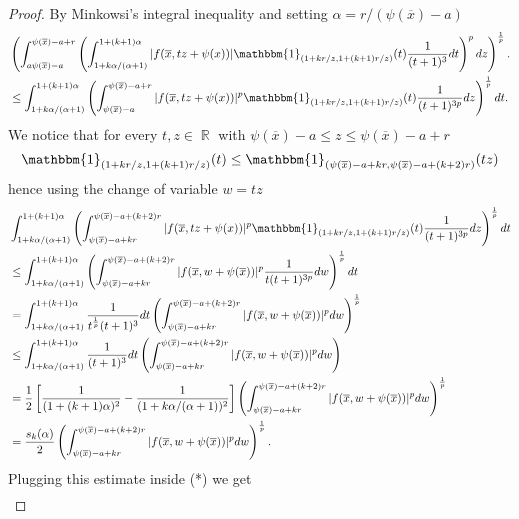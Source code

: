 \documentclass[12pt]{article}
\theoremstyle{definition}
\DeclareMathOperator\rr{\mathbb{R}}
\begin{document}
\begin{proof}
 By Minkowsi's integral inequality and setting $\alpha=r/(\psi(\overline x)-a)$
 \begin{align*}
  & \left( \int_{a\psi(\overline x) -a}^{\psi(\overline x) -a+r}\left (\int_{1+k\alpha/(\alpha+1)}^{1+(k+1)\alpha} |f(\overline x, tz+\psi(x))|\mathbbm{1}_{(1+kr/z,  1+(k+1)r/z ) }(t)\frac{1}{(t+1)^3}dt\right)^pdz \right)^{\frac{1}{p}}. \\
  &\le \int_{1+k\alpha/(\alpha+1)}^{1+(k+1)\alpha} \left ( \int_{\psi(\overline x) -a}^{\psi(\overline x) -a+r}|f(\overline x, tz+\psi(x))|^p\mathbbm{1}_{(1+kr/z,  1+(k+1)r/z ) }(t)\frac{1}{(t+1)^{3p}} dz \right) ^{\frac{1}{p}}dt.  
 \end{align*}
 We notice that for every $t,z \in \rr$ with $\psi(\overline x) -a \le z \le \psi(\overline x)-a+r$
 \[ \mathbbm{1}_{(1+kr/z,  1+(k+1)r/z ) }(t) \le \mathbbm{1}_{(\psi(\overline x)-a+kr, \psi(\overline x) - a+(k+2)r)}(tz)   \]
 hence using the change of variable $w=tz$
 \begin{align*}
 &\int_{1+k\alpha/(\alpha+1)}^{1+(k+1)\alpha} \left ( \int_{\psi(\overline x)-a+kr}^{\psi(\overline x)-a+(k+2)r}|f(\overline x, tz+\psi(x))|^p\mathbbm{1}_{(1+kr/z,  1+(k+1)r/z ) }(t)\frac{1}{(t+1)^{3p}} dz \right) ^{\frac{1}{p}}dt \\
&\le \int_{1+k\alpha/(\alpha+1)}^{1+(k+1)\alpha} \left ( \int_{\psi(\overline x)-a+kr}^{\psi(\overline x)-a+(k+2)r}|f(\overline x, w+\psi(\overline x))|^p \frac{1}{t(t+1)^{3p}} dw \right) ^{\frac{1}{p}}dt\\
&=\int_{1+k\alpha/(\alpha+1)}^{1+(k+1)\alpha}\frac{1}{t^{\frac{1}{p}}(t+1)^{3}}dt \left ( \int_{\psi(\overline x)-a+kr}^{\psi(\overline x)-a+(k+2)r}|f(\overline x, w+\psi(\overline x))|^p  dw \right) ^{\frac{1}{p}}\\
&\le \int_{1+k\alpha/(\alpha+1)}^{1+(k+1)\alpha}\frac{1}{(t+1)^{3}}dt \left ( \int_{\psi(\overline x)-a+kr}^{\psi(\overline x)-a+(k+2)r}|f(\overline x, w+\psi(\overline x))|^p  dw \right)\\
&= \frac{1}{2}\left[\frac{1}{(1+(k+1)\alpha)^2}-\frac{1}{(1+k\alpha/(\alpha+1))^2}\right] \left ( \int_{\psi(\overline x)-a+kr}^{\psi(\overline x)-a+(k+2)r}|f(\overline x, w+\psi(\overline x))|^p  dw \right) ^{\frac{1}{p}}\\
&=\frac{s_k(\alpha)}{2} \left ( \int_{\psi(\overline x)-a+kr}^{\psi(\overline x)-a+(k+2)r}|f(\overline x, w+\psi(\overline x))|^p  dw \right) ^{\frac{1}{p}}.
\end{align*}
Plugging this estimate inside (*) we get
\begin{align*}

\end{align*}
\end{proof}
\end{document}
